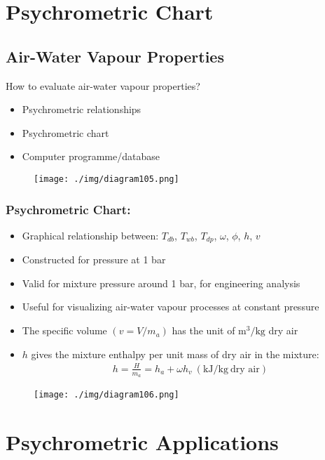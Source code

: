 \section{Psychrometric Chart}
\subsection{Air-Water Vapour Properties}
How to evaluate air-water vapour properties?
\begin{itemize}[noitemsep]
  \item Psychrometric relationships
  \item Psychrometric chart
  \item Computer programme/database
\end{itemize}
\begin{figure}[H]
  \centering
  \texttt{[image: ./img/diagram105.png]}
  \caption{}
\end{figure}
\subsubsection{Psychrometric Chart:}
\begin{itemize}[noitemsep]
  \item Graphical relationship between: $T_{db}$, $T_{wb}$, $T_{dp}$, $\omega$, $\phi$, $h$, $v$
  \item Constructed for pressure at 1 bar
  \item Valid for mixture pressure around 1 bar, for engineering analysis
  \item Useful for visualizing air-water vapour processes at constant pressure
  \item The specific volume $(v=V/m_a)$ has the unit of $\si{\metre\cubed\per\kilogram}$ dry air
  \item $h$ gives the mixture enthalpy per unit mass of dry air in the mixture:
        \begin{gather}
          h = \frac{H}{m_a} = h_a + \omega h_v \ (\si{\kilo\joule\per\kilogram} \ \text{dry air})
        \end{gather}
\end{itemize}
\begin{figure}[H]
  \centering
  \texttt{[image: ./img/diagram106.png]}
  \caption{}
\end{figure}
\section{Psychrometric Applications}
